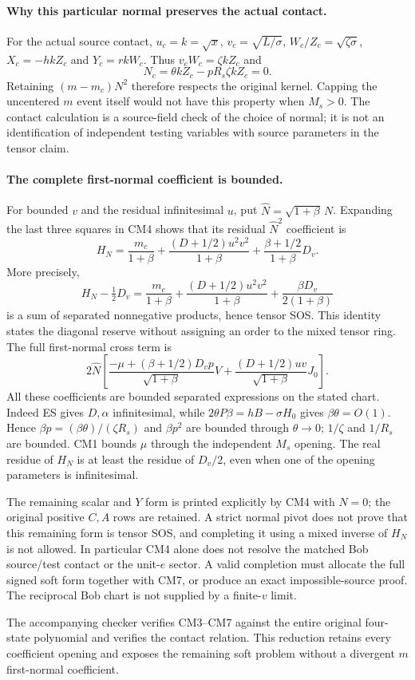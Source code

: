 \paragraph{Why this particular normal preserves the actual contact.}
For the actual source contact, $u_c=k=\sqrt x$,
$v_c=\sqrt{L/\sigma}$, $W_c/Z_c=\sqrt{\zeta\sigma}$,
$X_c=-hkZ_c$ and $Y_c=rkW_c$. Thus
$v_cW_c=\zeta kZ_c$ and
\[
 N_c=\theta kZ_c-pR_s\zeta kZ_c=0.\tag{CM5}
\]
Retaining $(m-m_c)N^2$ therefore respects the original kernel. Capping
the uncentered $m$ event itself would not have this property when $M_s>0$.
The contact calculation is a source-field check of the choice of normal;
it is not an identification of independent testing variables with source
parameters in the tensor claim.

\paragraph{The complete first-normal coefficient is bounded.}
For bounded $v$ and the residual infinitesimal $u$, put
$\widehat N=\sqrt{1+\beta}\,N$. Expanding the last three squares
in CM4 shows that its residual $\widehat N^2$ coefficient is
\[
 H_N=\frac{m_c}{1+\beta}
  +\frac{(D+1/2)u^2v^2}{1+\beta}
  +\frac{\beta+1/2}{1+\beta}D_v.
 \tag{CM6}
\]
More precisely,
\[
 H_N-\tfrac12D_v
 =\frac{m_c}{1+\beta}
  +\frac{(D+1/2)u^2v^2}{1+\beta}
  +\frac{\beta D_v}{2(1+\beta)}
\]
is a sum of separated nonnegative products, hence tensor SOS. This
identity states the diagonal reserve without assigning an order to
the mixed tensor ring.
The full first-normal cross term is
\[
 2\widehat N\left[
 \frac{-\mu+(\beta+1/2)D_vp}{\sqrt{1+\beta}}V
 +\frac{(D+1/2)uv}{\sqrt{1+\beta}}J_0\right].\tag{CM7}
\]
All these coefficients are bounded separated expressions on the stated
chart. Indeed ES gives $D,\alpha$ infinitesimal, while
$2\theta P\beta=hB-\sigma H_0$ gives $\beta\theta=O(1)$.
Hence $\beta p=(\beta\theta)/(\zeta R_s)$ and $\beta p^2$
are bounded through $\theta\to0$; $1/\zeta$ and $1/R_s$ are
bounded. CM1 bounds $\mu$ through the independent $M_s$ opening.
The real residue of $H_N$ is at least the residue of $D_v/2$, even
when one of the opening parameters is infinitesimal.

The remaining scalar and $Y$ form is printed explicitly by CM4 with
$N=0$; the original positive $C,A$ rows are retained. A strict normal
pivot does not prove that this remaining form is tensor SOS, and
completing it using a mixed inverse of $H_N$ is not allowed. In particular
CM4 alone does not resolve the matched Bob source/test contact or the
unit-$e$ sector. A valid completion must allocate the full signed soft
form together with CM7, or produce an exact impossible-source proof.
The reciprocal Bob chart is not supplied by a finite-$v$ limit.

The accompanying checker verifies CM3--CM7 against the entire original
four-state polynomial and verifies the contact relation. This reduction
retains every coefficient opening and exposes the remaining soft problem
without a divergent $m$ first-normal coefficient.
